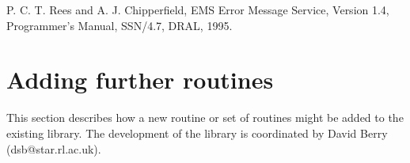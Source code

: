 {{         P. C. T. Rees and A. J. Chipperfield, EMS Error Message Service,
            Version 1.4, Programmer's Manual,
            SSN/4.7, DRAL, 1995.
   }
}


\section{Adding further routines}

   This section describes how a new routine or set of routines might be
   added to the existing library.
   The development of the library is coordinated by David Berry
   (dsb@star.rl.ac.uk).

